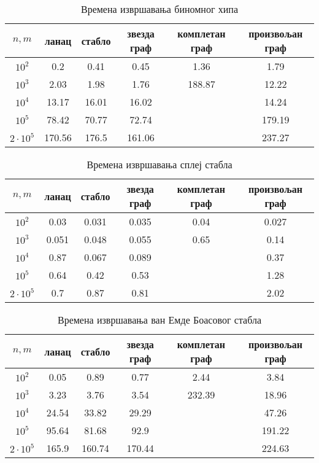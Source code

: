 \documentclass[11pt, a4paper]{article}
\theoremstyle{remark}
\numberwithin{equation}{section}
\begin{document}
	\begin{center}
	\begin{table}[H]
		\centering
		\caption{Времена извршавања биномног хипа}
		\begin{tabular}{cccccc} \toprule
			$n, m$ & ланац & стабло & звезда граф & комплетан граф & произвољан граф\\ \midrule
			$10^2$ & 0.2 & 0.41 & 0.45 & 1.36 & 1.79\\ 
			$10^3$ & 2.03 & 1.98 & 1.76 & 188.87 & 12.22\\
			$10^4$ & 13.17 & 16.01 & 16.02 & & 14.24\\
			$10^5$ & 78.42 & 70.77 & 72.74 & & 179.19\\
			$2\cdot 10^5$ & 170.56 & 176.5 & 161.06 & & 237.27\\
			\bottomrule
		\end{tabular}
	\end{table}
	\end{center}
	\begin{center}
	\begin{table}[H]
		\centering
		\caption{Времена извршавања сплеј стабла}
		\begin{tabular}{cccccc} \toprule
			$n, m$ & ланац & стабло & звезда граф & комплетан граф & произвољан граф\\ \midrule
			$10^2$ & 0.03 & 0.031 & 0.035 & 0.04 & 0.027\\ 
			$10^3$ & 0.051 & 0.048 & 0.055 & 0.65 & 0.14\\
			$10^4$ & 0.87 & 0.067 & 0.089 & & 0.37\\
			$10^5$ & 0.64 & 0.42 & 0.53 & & 1.28\\
			$2\cdot 10^5$ & 0.7 & 0.87 & 0.81 & & 2.02\\
			\bottomrule
		\end{tabular}
	\end{table}
	\end{center}
	\begin{center}
	\begin{table}[H]
		\centering
		\caption{Времена извршавања ван Емде Боасовог стабла}
		\begin{tabular}{cccccc} \toprule
			$n, m$ & ланац & стабло & звезда граф & комплетан граф & произвољан граф\\ \midrule
			$10^2$ & 0.05 & 0.89 & 0.77 & 2.44 & 3.84\\ 
			$10^3$ & 3.23 & 3.76 & 3.54 & 232.39 & 18.96\\
			$10^4$ & 24.54 & 33.82 & 29.29 & & 47.26\\
			$10^5$ & 95.64 & 81.68 & 92.9 & & 191.22\\
			$2\cdot 10^5$ & 165.9 & 160.74 & 170.44 & & 224.63\\
			\bottomrule
		\end{tabular}
	\end{table}
	\end{center}
\end{document}
